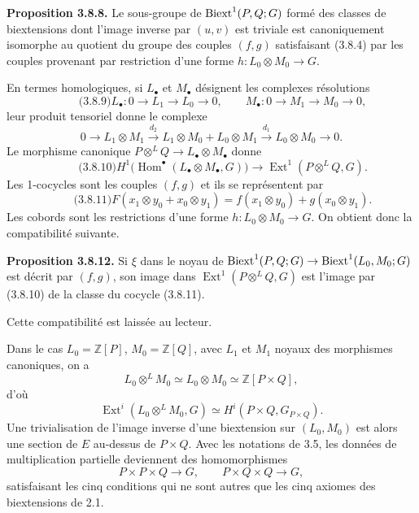 \documentclass[11pt]{article}
\providecommand{\Z}{\mathbb Z}
\providecommand{\Hom}{\operatorname{Hom}}
\providecommand{\Ext}{\operatorname{Ext}}
\begin{document}
\textbf{Proposition 3.8.8.}  Le sous-groupe de \(\operatorname{Biext}^1(P,Q;G)\) formé des classes de biextensions dont l'image inverse par \((u,v)\) est triviale est canoniquement isomorphe au quotient du groupe des couples \((f,g)\) satisfaisant (3.8.4) par les couples provenant par restriction d'une forme \(h:L_0\otimes M_0\to G\).

En termes homologiques, si \(L_\bullet\) et \(M_\bullet\) désignent les complexes résolutions
\begin{equation}\qquad\text{(3.8.9)}
        L_\bullet:0\to L_1\to L_0\to0,
        \qquad
        M_\bullet:0\to M_1\to M_0\to0,
\end{equation}
leur produit tensoriel donne le complexe
\[
        0\to L_1\otimes M_1\xrightarrow{d_2}
        L_1\otimes M_0+L_0\otimes M_1\xrightarrow{d_1}
        L_0\otimes M_0\to0.
\]
Le morphisme canonique \(P\otimes^L Q\to L_\bullet\otimes M_\bullet\) donne
\begin{equation}\qquad\text{(3.8.10)}
        H^1\bigl(\Hom^\bullet(L_\bullet\otimes M_\bullet,G)\bigr)\to \Ext^1(P\otimes^L Q,G).
\end{equation}
Les 1-cocycles sont les couples \((f,g)\) et ils se représentent par
\begin{equation}\qquad\text{(3.8.11)}
        F(x_1\otimes y_0+x_0\otimes y_1)=f(x_1\otimes y_0)+g(x_0\otimes y_1).
\end{equation}
Les cobords sont les restrictions d'une forme \(h:L_0\otimes M_0\to G\).  On obtient donc la compatibilité suivante.

\textbf{Proposition 3.8.12.}  Si \(\xi\) dans le noyau de \(\operatorname{Biext}^1(P,Q;G)\to\operatorname{Biext}^1(L_0,M_0;G)\) est décrit par \((f,g)\), son image dans \(\Ext^1(P\otimes^L Q,G)\) est l'image par (3.8.10) de la classe du cocycle (3.8.11).

Cette compatibilité est laissée au lecteur.

Dans le cas \(L_0=\Z[P]\), \(M_0=\Z[Q]\), avec \(L_1\) et \(M_1\) noyaux des morphismes canoniques, on a
\[
        L_0\otimes^L M_0\simeq L_0\otimes M_0\simeq \Z[P\times Q],
\]
d'où
\[
        \Ext^i(L_0\otimes^L M_0,G)\simeq H^i(P\times Q,G_{P\times Q}).
\]
Une trivialisation de l'image inverse d'une biextension sur \((L_0,M_0)\) est alors une section de \(E\) au-dessus de \(P\times Q\).  Avec les notations de 3.5, les données de multiplication partielle deviennent des homomorphismes
\[
        P\times P\times Q\to G,
        \qquad P\times Q\times Q\to G,
\]
satisfaisant les cinq conditions qui ne sont autres que les cinq axiomes des biextensions de 2.1.
\end{document}
